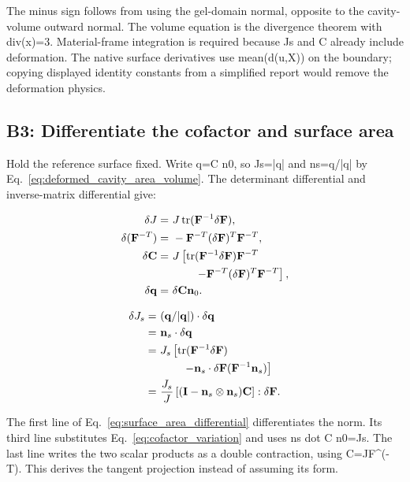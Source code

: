 \documentclass[11pt]{article}
\begin{document}
The minus sign follows from using the gel-domain normal, opposite to the cavity-volume outward normal. The volume equation is the divergence theorem with div(x)=3. Material-frame integration is required because Js and C already include deformation. The native surface derivatives use mean(d(u,X)) on the boundary; copying displayed identity constants from a simplified report would remove the deformation physics.

\subsection{B3: Differentiate the cofactor and surface area}

Hold the reference surface fixed. Write q=C n0, so Js=|q| and ns=q/|q| by Eq.~\eqref{eq:deformed_cavity_area_volume}. The determinant differential and inverse-matrix differential give:

\begin{align}
\delta J= & ~J\operatorname{tr}(\mathbf F^{-1}\delta\mathbf F), \notag \\
\delta(\mathbf F^{-T})= & ~-\mathbf F^{-T}(\delta\mathbf F)^T\mathbf F^{-T}, \notag \\
\delta\mathbf C= & ~J\left[\operatorname{tr}(\mathbf F^{-1}\delta\mathbf F)\mathbf F^{-T}\right. \notag \\
& ~\qquad\left.-\mathbf F^{-T}(\delta\mathbf F)^T\mathbf F^{-T}\right], \notag \\
\delta\mathbf q= & ~\delta\mathbf C\mathbf n_0. \label{eq:cofactor_variation}
\end{align}

\begin{align}
\delta J_s= & ~(\mathbf q/|\mathbf q|)\cdot\delta\mathbf q \notag \\
= & ~\mathbf n_s\cdot\delta\mathbf q \notag \\
= & ~J_s\left[\operatorname{tr}(\mathbf F^{-1}\delta\mathbf F)\right. \notag \\
& ~\qquad\left.-\mathbf n_s\cdot\delta\mathbf F(\mathbf F^{-1}\mathbf n_s)\right] \notag \\
= & ~\frac{J_s}{J}\left[(\mathbf I-\mathbf n_s\otimes\mathbf n_s)\mathbf C\right] : \delta\mathbf F. \label{eq:surface_area_differential}
\end{align}

The first line of Eq.~\eqref{eq:surface_area_differential} differentiates the norm. Its third line substitutes Eq.~\eqref{eq:cofactor_variation} and uses ns dot C n0=Js. The last line writes the two scalar products as a double contraction, using C=JF\textasciicircum{}(-T). This derives the tangent projection instead of assuming its form.
\end{document}
